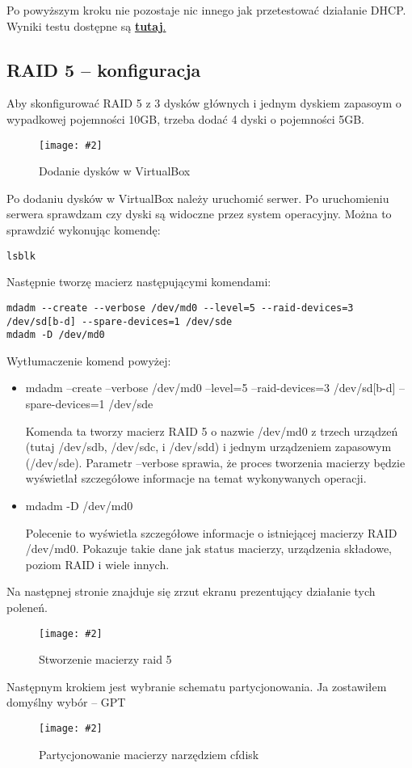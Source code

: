 \documentclass[a4paper]{article}
\newcommand*{\zdj}[2][\textwidth]{\texttt{[image: \#2]}}
\newcommand*{\fg}[4][!htb]{
      \begin{figure*}[#1]
            \zdj{#2}
            \caption[#4]{#3}
      \end{figure*}
}
\begin{document}
Po powyższym kroku nie pozostaje nic innego jak przetestować działanie DHCP. Wyniki testu dostępne są \hyperref[fig:dhcp-test]{\textbf{tutaj}.}

\newpage
\subsection{RAID 5 – konfiguracja}
Aby skonfigurować RAID 5 z 3 dysków głównych i jednym dyskiem zapasoym o wypadkowej pojemności 10GB, trzeba dodać 4 dyski o pojemności 5GB. 
\fg{contents/configuration/Raid5/1.png}{Dodanie dysków w VirtualBox}{Dodanie dysków w VirtualBox}

Po dodaniu dysków w VirtualBox należy uruchomić serwer. Po uruchomieniu serwera sprawdzam czy dyski są widoczne przez system operacyjny. Można to sprawdzić wykonując komendę:
\begin{Verbatim}[frame=single]
lsblk
\end{Verbatim}

Następnie tworzę macierz następującymi komendami: 
\begin{Verbatim}[frame=single,fontsize=\small, breaklines=true]
mdadm --create --verbose /dev/md0 --level=5 --raid-devices=3 /dev/sd[b-d] --spare-devices=1 /dev/sde
mdadm -D /dev/md0
\end{Verbatim}
Wytłumaczenie komend powyżej:
\begin{itemize}
      \item mdadm --create --verbose /dev/md0 --level=5 --raid-devices=3 /dev/sd[b-d] --spare-devices=1 /dev/sde
      
      Komenda ta tworzy macierz RAID 5 o nazwie /dev/md0 z trzech urządzeń (tutaj /dev/sdb, /dev/sdc, i /dev/sdd) i jednym urządzeniem zapasowym (/dev/sde). Parametr --verbose sprawia, że proces tworzenia macierzy będzie wyświetlał szczegółowe informacje na temat wykonywanych operacji.
      
      \item mdadm -D /dev/md0
      
      Polecenie to wyświetla szczegółowe informacje o istniejącej macierzy RAID /dev/md0. Pokazuje takie dane jak status macierzy, urządzenia składowe, poziom RAID i wiele innych.
      \end{itemize}
Na następnej stronie znajduje się zrzut ekranu prezentujący działanie tych poleneń.
\newpage
\fg{contents/configuration/Raid5/2.png}{Stworzenie macierzy raid 5}{Stworzenie macierzy raid 5}

Następnym krokiem jest wybranie schematu partycjonowania. Ja zostawiłem domyślny wybór – GPT
\fg{contents/configuration/Raid5/4.png}{Partycjonowanie macierzy narzędziem cfdisk}{Partycjonowanie macierzy narzędziem cfdisk}
\end{document}
